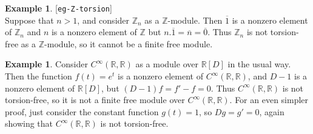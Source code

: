 \documentclass{amsart}
\newcommand{\lbl}[1]{\label{#1}\textup{[\texttt{#1}]}\ \\}
\newcommand{\lbl}{\label}
\newcommand{\R}         {{\mathbb{R}}}
\newcommand{\Z}         {{\mathbb{Z}}}
\newcommand{\ov}[1]     {\overline{#1}}
\newcommand{\CRR}       {C^\infty(\R,\R)}
\renewcommand{\:}{\colon}
\theoremstyle{definition}
\newtheorem{example}[theorem]{Example}
\begin{document}
\begin{example}\lbl{eg-Z-torsion}
 Suppose that $n>1$, and consider $\Z_n$ as a $\Z$-module.  Then
 $\ov{1}$ is a nonzero element of $\Z_n$ and $n$ is a nonzero element
 of $\Z$ but $n.\ov{1}=\ov{n}=\ov{0}$.  Thus $\Z_n$ is not
 torsion-free as a $\Z$-module, so it cannot be a finite free module.
\end{example}
\begin{example}
 Consider $\CRR$ as a module over $\R[D]$ in the usual way.  Then the
 function $f(t)=e^t$ is a nonzero element of $\CRR$, and $D-1$ is a
 nonzero element of $\R[D]$, but $(D-1)f=f'-f=0$.  Thus $\CRR$ is not
 torsion-free, so it is not a finite free module over $\CRR$.  For an
 even simpler proof, just consider the constant function $g(t)=1$, so
 $Dg=g'=0$, again showing that $\CRR$ is not torsion-free. 
\end{example}
\end{document}
